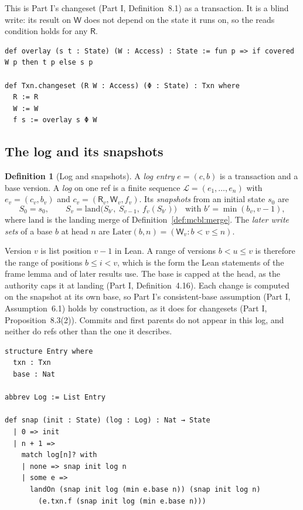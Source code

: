 \documentclass[11pt,letterpaper]{article}
\theoremstyle{definition}
\newtheorem{definition}[theorem]{Definition}
\theoremstyle{remark}
\newcommand{\R}{\mathsf{R}}
\newcommand{\W}{\mathsf{W}}
\newcommand{\Snap}[1]{S_{#1}}
\newcommand{\Log}{\mathcal{L}}
\newcommand{\Later}{\mathrm{Later}}
\newcommand{\op}[1]{\mathrm{#1}}
\newcommand{\lnd}{\op{land}}
\begin{document}
This is Part I's changeset (Part I, Definition~8.1) as a transaction. It is a blind write: its result on $\W$ does not depend on the state it runs on, so the reads condition holds for any $\R$.

\begin{lstlisting}[language=Lean,caption={Changesets as transactions (\texttt{YonedaTx/State.lean})},label={lst:mcbl:changeset}]
def overlay (s t : State) (W : Access) : State := fun p => if covered W p then t p else s p

def Txn.changeset (R W : Access) (Φ : State) : Txn where
  R := R
  W := W
  f s := overlay s Φ W
\end{lstlisting}

\subsection{The log and its snapshots}

\begin{definition}[Log and snapshots]
\label{def:mcbl:log}
A \emph{log entry} $e=(c,b)$ is a transaction and a base version. A \emph{log} on one ref is a finite sequence $\Log=(e_1,\dots,e_n)$ with $e_v=(c_v,b_v)$ and $c_v=(\R_v,\W_v,f_v)$. Its \emph{snapshots} from an initial state $s_0$ are
\[
\Snap{0}=s_0,\qquad \Snap{v}=\lnd\bigl(\Snap{b'},\ \Snap{v-1},\ f_v(\Snap{b'})\bigr)\quad\text{with } b'=\min(b_v,v-1),
\]
where $\lnd$ is the landing merge of Definition~\ref{def:mcbl:merge}. The \emph{later write sets} of a base $b$ at head $n$ are $\Later(b,n)=(\W_v : b<v\leq n)$.
\end{definition}

Version $v$ is list position $v-1$ in Lean. A range of versions $b<u\leq v$ is therefore the range of positions $b\leq i<v$, which is the form the Lean statements of the frame lemma and of later results use. The base is capped at the head, as the authority caps it at landing (Part I, Definition~4.16). Each change is computed on the snapshot at its own base, so Part I's consistent-base assumption (Part I, Assumption~6.1) holds by construction, as it does for changesets (Part I, Proposition~8.3(2)). Commits and first parents do not appear in this log, and neither do refs other than the one it describes.

\begin{lstlisting}[language=Lean,caption={Log entries and snapshots (\texttt{YonedaTx/Log.lean})},label={lst:mcbl:log}]
structure Entry where
  txn : Txn
  base : Nat

abbrev Log := List Entry

def snap (init : State) (log : Log) : Nat → State
  | 0 => init
  | n + 1 =>
    match log[n]? with
    | none => snap init log n
    | some e =>
      landOn (snap init log (min e.base n)) (snap init log n)
        (e.txn.f (snap init log (min e.base n)))
\end{lstlisting}
\end{document}
